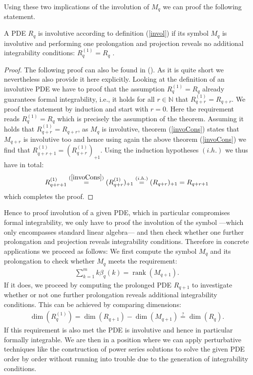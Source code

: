 Using these two implications of the involution of $M_q$ we can proof the following statement.
\begin{theorem}
A PDE $R_q$ is involutive according to definition (\ref{invol}) if its symbol $M_q$ is involutive and performing one prolongation and projection reveals no additional integrability conditions: $R_q^{(1)} = R_q$ .
\end{theorem}
\begin{proof}
The following proof can also be found in (\cite{seiler1994analysis}). As it is quite short we nevertheless also provide it here explicitly.
Looking at the definition of an involutive PDE we have to proof that the assumption $R_q^{(1)} = R_q$ already guarantees formal integrability, i.e., it holds for all $r \in \mathbb{N}$ that $R_{q+r}^{(1)} = R_{q+r}$. We proof the statement by induction and start with $r=0$. Here the requirement reads $R_q^{(1)}=R_q$ which is precisely the assumption of the theorem. Assuming it holds that $R_{q+r}^{(1)}=R_{q+r}$, as $M_q$ is involutive, theorem (\ref{invoCons}) states that $M_{q+r}$ is involutive too and hence using again the above theorem (\ref{invoCons}) we find that $R_{q+r+1}^{(1)}= (R_{q+r}^{(1)})_{+1}$. Using the induction hypotheses $(i.h.)$ we thus have in total:
\begin{align}
   R_{q+r+1}^{(1)} \overset{(\ref{invoCons})}{=} (R_{q+r}^{(1)})_{+1} \overset{(i.h.)}{=} (R_{q+r})_{+1} = R_{q+r+1} 
\end{align}
which completes the proof. 
\end{proof}
Hence to proof involution of a given PDE, which in  particular compromises formal integrability, we only have to proof the involution of the symbol ---which only encompasses standard linear algebra--- and then check whether one further prolongation and projection reveals integrability conditions. Therefore in concrete applications we proceed as follows: We first compute the symbol $M_q$ and its prolongation to check whether $M_q$ meets the requirement: 
\begin{align}
        \sum_{k=1}^m k\beta_q(k) = \operatorname{rank}(M_{q+1}).
\end{align}
If it does, we proceed by computing the prolonged PDE $R_{q+1}$ to investigate whether or not one further prolongation reveals additional integrability conditions. This can be achieved by comparing dimensions:
\begin{align}\label{dims}
    \operatorname{dim}(R_q^{(1)}) = \operatorname{dim}(R_{q+1}) - \operatorname{dim}(M_{q+1}) \stackrel{?}{=} \operatorname{dim}(R_q).
\end{align}
If this requirement is also met the PDE is involutive and hence in particular formally integrable. We are then in a position where we can apply perturbative techniques like the construction of power series solutions to solve the given PDE order by order without running into trouble due to the generation of integrability conditions.

